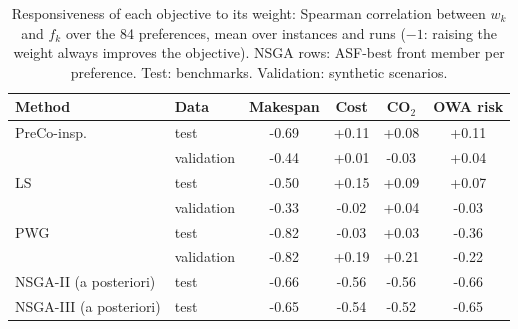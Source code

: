 \begin{table}[htbp]
\centering
\caption{Responsiveness of each objective to its weight: Spearman correlation between $w_k$ and $f_k$ over the 84 preferences, mean over instances and runs ($-1$: raising the weight always improves the objective). NSGA rows: ASF-best front member per preference. Test: benchmarks. Validation: synthetic scenarios.}
\label{tab:resp}
\footnotesize
\setlength{\tabcolsep}{3pt}
\begin{tabular}{llcccc}
\toprule
Method & Data & Makespan & Cost & CO$_2$ & OWA risk \\
\midrule
PreCo-insp. & test & -0.69 & +0.11 & +0.08 & +0.11 \\
 & validation & -0.44 & +0.01 & -0.03 & +0.04 \\
LS & test & -0.50 & +0.15 & +0.09 & +0.07 \\
 & validation & -0.33 & -0.02 & +0.04 & -0.03 \\
PWG & test & -0.82 & -0.03 & +0.03 & -0.36 \\
 & validation & -0.82 & +0.19 & +0.21 & -0.22 \\
NSGA-II (a posteriori) & test & -0.66 & -0.56 & -0.56 & -0.66 \\
NSGA-III (a posteriori) & test & -0.65 & -0.54 & -0.52 & -0.65 \\
\bottomrule
\end{tabular}
\end{table}
